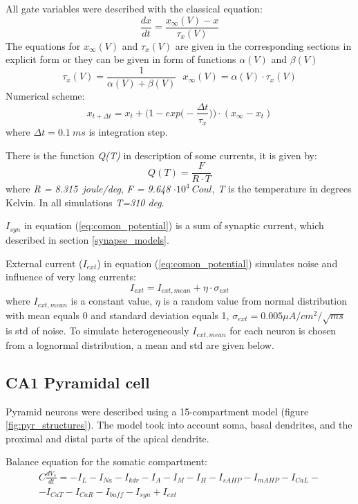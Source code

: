 \documentclass[a4paper,12pt]{article}
\begin{document}
All gate variables were described with the classical equation: 
\begin{equation}
\frac{dx}{dt} = \frac{x_{\infty}(V) - x}{\tau_x(V)}
\end{equation}
The equations for $x_{\infty}(V)$ and $\tau_x(V)$ are given in the corresponding sections in explicit form or they can be given in form of functions  $\alpha(V)$ and $\beta(V)$
\begin{equation}
\tau_x(V) =  \frac{1}{\alpha(V) + \beta(V)} \ \ \ 
x_{\infty}(V) = \alpha(V) \cdot \tau_x(V)
\end{equation}
Numerical scheme:
\begin{equation}
x_{t + \Delta t} = x_t+\Big(1 - exp \Big(-\frac{\Delta t}{\tau_x} \Big) \Big)\cdot (x_{\infty}-x_t) 
\end{equation}
where $\Delta t = 0.1\ ms$ is integration step.

There is the function \textit{Q(T)} in description of some currents, it is given by:
\begin{equation}
\label{eq:QT}
Q(T)= \frac{F}{ R \cdot T }
\end{equation}
where \textit{R = 8.315\ joule/deg}, \textit{F = 9.648} $\cdot 10^4 \ Coul$,
\textit{T} is the temperature in degrees Kelvin. In all simulations \textit{T=310 deg}.


$I_{syn}$ in equation (\ref{eq:comon_potential}) is a sum of synaptic current, which described in section \ref{synapse_models}. 

External current ($I_{ext}$) in equation (\ref{eq:comon_potential}) simulates noise and influence of very long currents:
\begin{equation}
I_{ext} = I_{ext, mean} + \eta \cdot \sigma_{ext}
\end{equation}
where $I_{ext, mean}$ is a constant value,  $ \eta$ is a random value from normal distribution with mean equals 0 and standard deviation equals 1, $\sigma_{ext}=0.005 \mu A/cm^2/\sqrt{ms}$ is std of noise. To simulate heterogeneously $I_{ext, mean}$ for each neuron is chosen from a lognormal distribution, a mean and std are given below. 

\subsection{CA1 Pyramidal cell}
Pyramid neurons were described using a 15-compartment model (figure \ref{fig:pyr_structures}). The model took into account soma, basal dendrites, and the proximal and distal parts of the apical dendrite. \par
Balance equation for the somatic compartment:
\begin{eqnarray}
C\frac{dV_s}{dt}=-I_L-I_{Na}-I_{kdr}-I_A-I_M-I_H-I_{sAHP}-I_{mAHP}-I_{CaL}- \nonumber \\ -I_{CaT}-I_{CaR}-I_{buff}-I_{syn} + I_{ext}
\end{eqnarray}
\end{document}
